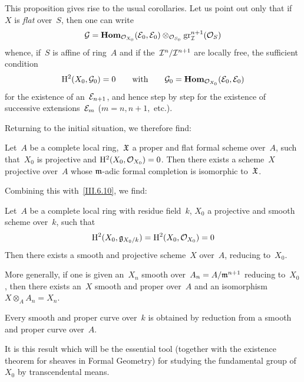 This proposition gives rise to the usual corollaries. Let us point
out only that if~$X$ is \emph{flat} over~$S$, then one can write
$$
\cal{G}= \SheafHom_{\cal{O}_{X_0}}(\cal{E}_0, \cal{E}_0)
\otimes_{\cal{O}_{S_0}} \gr_{\cal{I}}^{n+1}(\cal{O}_S)
$$
whence, if~$S$ is affine of ring~$A$ and if the~$\cal{I}^n/\cal{I}^{n+1}$
are locally free, the sufficient condition
$$
\H^2(X_0,\cal{G}_0)=0 \qquad\text{with}\qquad
\cal{G}_0=\SheafHom_{\cal{O}_{X_0}}(\cal{E}_0, \cal{E}_0)
$$
for the existence of an~$\cal{E}_{n+1}$, and hence step by step for
the existence of successive extensions~$\cal{E}_m$ ($m=n,n+1,$
etc.).

Returning to the initial situation, we therefore find:

\begin{proposition}\label{III.7.2}
Let~$A$ be a complete local ring,~$\goth{X}$ a proper and flat formal
scheme over~$A$, such that~$X_0$ is projective and
$\H^2(X_0,\cal{O}_{X_0})=0$. Then there exists a scheme~$X$
projective over~$A$ whose $\goth{m}$-adic formal completion is
isomorphic to~$\goth{X}$.
\end{proposition}

Combining this with~\ref{III.6.10}, we find:

\begin{theorem}\label{III.7.3}
Let~$A$ be a complete local ring with residue field~$k$, $X_0$ a
projective and smooth scheme over~$k$, such that
$$
\H^2(X_0,\goth{g}_{X_0/k})=\H^2(X_0,\cal{O}_{X_0})=0
$$
Then there exists a smooth and projective scheme~$X$ over~$A$,
reducing to~$X_0$.
\end{theorem}

More generally, if one is given an~$X_n$ smooth over~$A_n=A/\goth{m}^{n+1}$
reducing to~$X_0$, then there exists an~$X$ smooth and proper over~$A$
and an isomorphism~$X\otimes_AA_n=X_n$.

\begin{corollary}\label{III.7.4}
Every smooth and proper curve over~$k$ is obtained by reduction from
a smooth and proper curve over~$A$.
\end{corollary}

It is this result which will be the essential tool (together with the
existence theorem for sheaves in Formal Geometry) for studying the
fundamental group of~$X_0$ by transcendental means.
%
%
